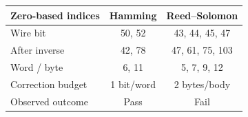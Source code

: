 \begin{tabular}{@{}lcc@{}}\toprule
Zero-based indices & Hamming & Reed--Solomon\\\midrule
Wire bit & 50, 52 & 43, 44, 45, 47\\
After inverse & 42, 78 & 47, 61, 75, 103\\
Word / byte & 6, 11 & 5, 7, 9, 12\\
Correction budget & 1 bit/word & 2 bytes/body\\
Observed outcome & Pass & Fail\\
\bottomrule\end{tabular}
